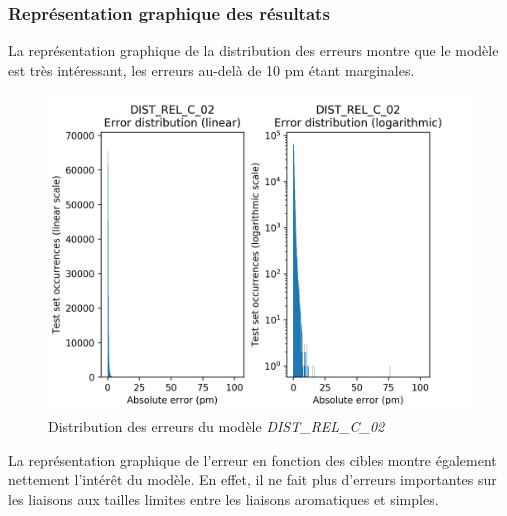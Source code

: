 \subsubsection{Représentation graphique des résultats}
\par La représentation graphique de la distribution des erreurs montre que le modèle est très intéressant, les erreurs au-delà de 10 pm étant marginales. \\

\begin{figure}[!h]
	\centering
	
	\includegraphics[scale=0.7]{../figures/DIST_REL_C_02/DIST_REL_C_02_distrib_rmse_val.png}	
	
	\caption{Distribution des erreurs du modèle \emph{DIST\_REL\_C\_02}}
\end{figure}

\par La représentation graphique de l'erreur en fonction des cibles montre également nettement l'intérêt du modèle. En effet, il ne fait plus d'erreurs importantes sur les liaisons aux tailles limites entre les liaisons aromatiques et simples. \\

